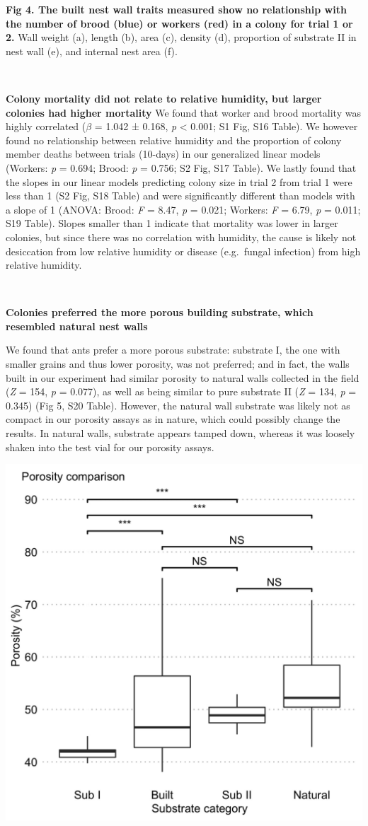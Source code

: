 \documentclass[3p]{elsarticle} %
\begin{document}
\textbf{Fig 4. The built nest wall traits measured show no relationship
with the number of brood (blue) or workers (red) in a colony for trial 1
or 2.} Wall weight (a), length (b), area (c), density (d), proportion of
substrate II in nest wall (e), and internal nest area (f).

~

\textbf{Colony mortality did not relate to relative humidity, but larger
colonies had higher mortality } We found that worker and brood mortality
was highly correlated (\(\beta\) = 1.042 ± 0.168, \emph{p} \textless{}
0.001; S1 Fig, S16 Table). We however found no relationship between
relative humidity and the proportion of colony member deaths between
trials (10-days) in our generalized linear models (Workers: \emph{p} =
0.694; Brood: \emph{p} = 0.756; S2 Fig, S17 Table). We lastly found that
the slopes in our linear models predicting colony size in trial 2 from
trial 1 were less than 1 (S2 Fig, S18 Table) and were significantly
different than models with a slope of 1 (ANOVA: Brood: \emph{F} = 8.47,
\emph{p} = 0.021; Workers: \emph{F} = 6.79, \emph{p} = 0.011; S19
Table). Slopes smaller than 1 indicate that mortality was lower in
larger colonies, but since there was no correlation with humidity, the
cause is likely not desiccation from low relative humidity or disease
(e.g.~fungal infection) from high relative humidity.

~

\textbf{Colonies preferred the more porous building substrate, which
resembled natural nest walls}

We found that ants prefer a more porous substrate: substrate I, the one
with smaller grains and thus lower porosity, was not preferred; and in
fact, the walls built in our experiment had similar porosity to natural
walls collected in the field (\emph{Z} = 154, \emph{p} = 0.077), as well
as being similar to pure substrate II (\emph{Z} = 134, \emph{p} = 0.345)
(Fig 5, S20 Table). However, the natural wall substrate was likely not
as compact in our porosity assays as in nature, which could possibly
change the results. In natural walls, substrate appears tamped down,
whereas it was loosely shaken into the test vial for our porosity
assays.

\begin{flushleft}\includegraphics[width=0.67\linewidth,height=0.5\textheight]{../figures/Fig5} \end{flushleft}
\end{document}
